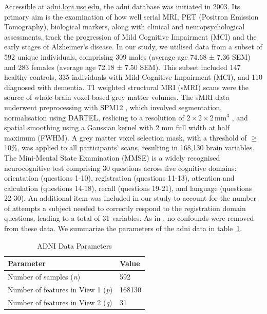 Accessible at \url{adni.loni.usc.edu}, the \acrshort{adni} database was initiated in 2003. 
Its primary aim is the examination of how well serial MRI, PET (Positron Emission Tomography), biological markers, along with clinical and neuropsychological assessments, track the progression of Mild Cognitive Impairment (MCI) and the early stages of Alzheimer’s disease. 
In our study, we utilised data from a subset of 592 unique individuals, comprising 309 males (average age 74.68 ± 7.36 SEM) and 283 females (average age 72.18 ± 7.50 SEM). This subset included 147 healthy controls, 335 individuals with Mild Cognitive Impairment (MCI), and 110 diagnosed with dementia. 
T1 weighted structural MRI (sMRI) scans were the source of whole-brain voxel-based grey matter volumes. The sMRI data underwent preprocessing with SPM12 \citep{ashburner2014spm12}, which involved segmentation, normalisation using DARTEL, reslicing to a resolution of \(2 \times 2 \times 2 \, \text{mm}^3\)
, and spatial smoothing using a Gaussian kernel with 2 mm full width at half maximum (FWHM). A grey matter voxel selection mask, with a threshold of $\geq$10\%, was applied to all participants' scans, resulting in 168,130 brain variables. 
The Mini-Mental State Examination (MMSE) is a widely recognised neurocognitive test comprising 30 questions across five cognitive domains\citep{folstein1975mini}: orientation (questions 1-10), registration (questions 11-13), attention and calculation (questions 14-18), recall (questions 19-21), and language (questions 22-30).
An additional item was included in our study to account for the number of attempts a subject needed to correctly respond to the registration domain questions, leading to a total of 31 variables. As in \citet{monteiro2016multiple}, no confounds were removed from these data.
We summarize the parameters of the \acrshort{adni} data in table~\ref{tab:adni-parameters}.

\begin{table}
    \centering
    \caption{ADNI Data Parameters}
    \begin{tabular}{| l | l |}
        \hline
        \textbf{Parameter}                        & \textbf{Value} \\
        \hline
        Number of samples (\textit{n})            & 592            \\
        Number of features in View 1 (\textit{p}) & 168130         \\
        Number of features in View 2 (\textit{q}) & 31             \\
        \hline
    \end{tabular}\label{tab:adni-parameters}
\end{table}


